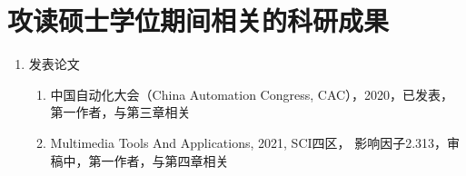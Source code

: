 \chapter{攻读硕士学位期间相关的科研成果}

\begin{enumerate}
	\item 发表论文
	\begin{enumerate}
		\item 中国自动化大会（China Automation Congress, CAC），2020，已发表，
		第一作者，与第三章相关
		\item Multimedia Tools And Applications, 2021, SCI四区，
		影响因子2.313，审稿中，第一作者，与第四章相关
	\end{enumerate}
\end{enumerate}
	

